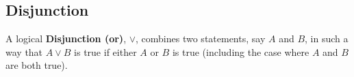 \subsection{Disjunction}

\begin{defn}
  \label{defn:Disjunction}
  A logical \textbf{Disjunction (or)}, $\lor$, combines two statements, say $A$ and $B$, in such a way that $A\lor B$ is true if either $A$ or $B$ is true (including the case where $A$ and $B$ are both true).
\end{defn}

